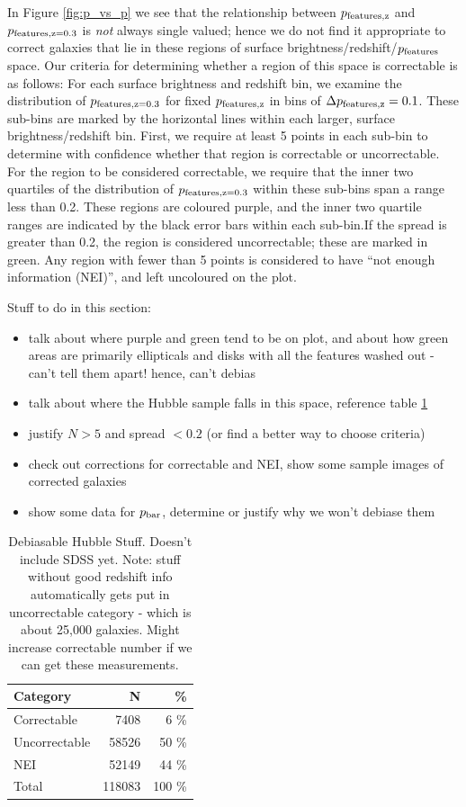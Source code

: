\documentclass[usenatbib]{mn2e}
\newcommand{\pbar}{p_{\rm bar}}
\begin{document}
In Figure \ref{fig:p_vs_p} we see that the relationship between $p_{\rm features,z}$ and $p_{\rm features,z=0.3}$ is \emph{not} always single valued; hence we do not find it appropriate to correct galaxies that lie in these regions of surface brightness/redshift/$p_{\rm features}$ space. Our criteria for determining whether a region of this space is correctable is as follows: For each surface brightness and redshift bin, we examine the distribution of $p_{\rm features,z=0.3}$ for fixed $p_{\rm features,z}$ in bins of $\Delta p_{\rm features,z} = 0.1$. These sub-bins are marked by the horizontal lines within each larger, surface brightness/redshift bin. First, we require at least 5 points in each sub-bin to determine with confidence whether that region is correctable or uncorrectable. For the region to be considered correctable, we require that the inner two quartiles of the distribution of $p_{\rm features,z=0.3}$ within these sub-bins span a range less than 0.2. These regions are coloured purple, and the inner two quartile ranges are indicated by the black error bars within each sub-bin.If the spread is greater than 0.2, the region is considered uncorrectable; these are marked in green. Any region with fewer than 5 points is considered to have ``not enough information (NEI)'', and left uncoloured on the plot. 

Stuff to do in this section: 

\begin{itemize}
\item talk about where purple and green tend to be on plot, and about how green areas are primarily ellipticals and disks with all the features washed out - can't tell them apart! hence, can't debias
\item talk about where the Hubble sample falls in this space, reference table \ref{hubble_debiasable} 
\item justify $N>5$ and spread $< 0.2$ (or find a better way to choose criteria)
\item check out corrections for correctable and NEI, show some sample images of corrected galaxies
\item show some data for $\pbar$, determine or justify why we won't debiase them  
\end{itemize}
 
\begin{table}
\caption{Debiasable Hubble Stuff. Doesn't include SDSS yet. Note: stuff without good redshift info automatically gets put in uncorrectable category - which is about 25,000 galaxies. Might increase correctable number if we can get these measurements. \label{hubble_debiasable}}
\begin{tabular}{lrr}
\hline\hline
Category &  N & \% \\
\hline
Correctable   & 7408 & 6 \%  \\
Uncorrectable & 58526 & 50 \%\\
NEI           & 52149 & 44 \% \\
Total         & 118083 & 100 \% \\
\hline\hline
\end{tabular}
\end{table}
\end{document}
